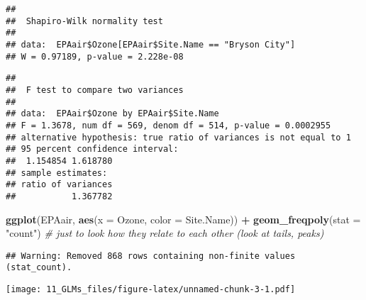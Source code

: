 \documentclass[]{article}
\newenvironment{Shaded}{\begin{snugshade}}{\end{snugshade}}
\newcommand{\KeywordTok}[1]{\textcolor[rgb]{0.13,0.29,0.53}{\textbf{#1}}}
\newcommand{\DataTypeTok}[1]{\textcolor[rgb]{0.13,0.29,0.53}{#1}}
\newcommand{\StringTok}[1]{\textcolor[rgb]{0.31,0.60,0.02}{#1}}
\newcommand{\CommentTok}[1]{\textcolor[rgb]{0.56,0.35,0.01}{\textit{#1}}}
\newcommand{\OperatorTok}[1]{\textcolor[rgb]{0.81,0.36,0.00}{\textbf{#1}}}
\newcommand{\NormalTok}[1]{#1}
\begin{document}
\begin{verbatim}
## 
##  Shapiro-Wilk normality test
## 
## data:  EPAair$Ozone[EPAair$Site.Name == "Bryson City"]
## W = 0.97189, p-value = 2.228e-08
\end{verbatim}

\begin{Shaded}
\end{Shaded}

\begin{verbatim}
## 
##  F test to compare two variances
## 
## data:  EPAair$Ozone by EPAair$Site.Name
## F = 1.3678, num df = 569, denom df = 514, p-value = 0.0002955
## alternative hypothesis: true ratio of variances is not equal to 1
## 95 percent confidence interval:
##  1.154854 1.618780
## sample estimates:
## ratio of variances 
##           1.367782
\end{verbatim}

\begin{Shaded}
\begin{Highlighting}[]
\KeywordTok{ggplot}\NormalTok{(EPAair, }\KeywordTok{aes}\NormalTok{(}\DataTypeTok{x =}\NormalTok{ Ozone, }\DataTypeTok{color =}\NormalTok{ Site.Name)) }\OperatorTok{+}
\StringTok{  }\KeywordTok{geom_freqpoly}\NormalTok{(}\DataTypeTok{stat =} \StringTok{"count"}\NormalTok{) }\CommentTok{# just to look how they relate to each other (look at tails, peaks)}
\end{Highlighting}
\end{Shaded}

\begin{verbatim}
## Warning: Removed 868 rows containing non-finite values (stat_count).
\end{verbatim}

\texttt{[image: 11\_GLMs\_files/figure-latex/unnamed-chunk-3-1.pdf]}

\begin{Shaded}
\end{Shaded}
\end{document}
